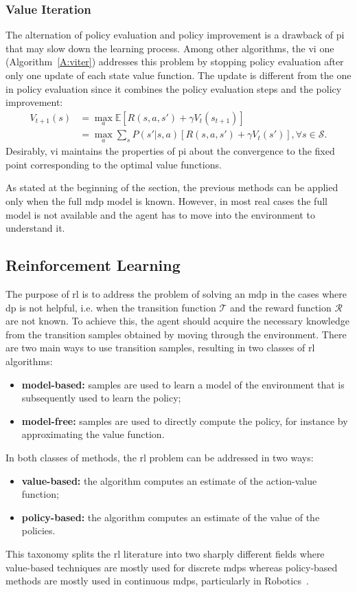 \subsubsection{Value Iteration}
The alternation of policy evaluation and policy improvement is a drawback of \gls{pi} that may slow down the learning process. Among other algorithms, the \gls{vi} one (Algorithm~\ref{A:viter}) addresses this problem by stopping policy evaluation after only one update of each state value function. The update is different from the one in policy evaluation since it combines the policy evaluation steps and the policy improvement:
\begin{align}
 V_{t+1} (s) &= \max_a \mathbb{E}[R(s,a,s') + \gamma V_t(s_{t+1})]\nonumber\\
             &= \max_a \sum_s P(s' | s, a)[R(s,a,s') + \gamma V_t(s')], \forall s \in \mathcal{S}. 
\end{align}
Desirably, \gls{vi} maintains the properties of \gls{pi} about the convergence to the fixed point corresponding to the optimal value functions.

As stated at the beginning of the section, the previous methods can be applied only when the full \gls{mdp} model is known. However, in most real cases the full model is not available and the agent has to move into the environment to understand it.

\subsection{Reinforcement Learning}
The purpose of \gls{rl} is to address the problem of solving an \gls{mdp} in the cases where \gls{dp} is not helpful, i.e. when the transition function $\mathcal{T}$ and the reward function $\mathcal{R}$ are not known. To achieve this, the agent should acquire the necessary knowledge from the transition samples obtained by moving through the environment. There are two main ways to use transition samples, resulting in two classes of \gls{rl} algorithms:
\begin{itemize}
 \item \textbf{model-based:} samples are used to learn a model of the environment that is subsequently used to learn the policy;
 \item \textbf{model-free:} samples are used to directly compute the policy, for instance by approximating the value function.
\end{itemize}
In both classes of methods, the \gls{rl} problem can be addressed in two ways:
\begin{itemize}
 \item \textbf{value-based:} the algorithm computes an estimate of the action-value function;
 \item \textbf{policy-based:} the algorithm computes an estimate of the value of the policies.
\end{itemize}
This taxonomy splits the \gls{rl} literature into two sharply different fields where value-based techniques are mostly used for discrete \glspl{mdp} whereas policy-based methods are mostly used in continuous \glspl{mdp}, particularly in Robotics~\cite{kober2013reinforcement}.

